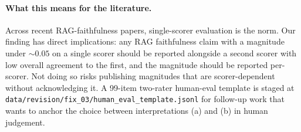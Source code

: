 \paragraph{What this means for the literature.}
Across recent RAG-faithfulness papers, single-scorer evaluation
is the norm. Our finding has direct implications: any RAG
faithfulness claim with a magnitude under $\sim 0.05$ on a single
scorer should be reported alongside a second scorer with low
overall agreement to the first, and the magnitude should be
reported per-scorer. Not doing so risks publishing magnitudes
that are scorer-dependent without acknowledging it.
A 99-item two-rater human-eval template is staged at
\texttt{data/revision/fix\_03/human\_eval\_template.jsonl} for
follow-up work that wants to anchor the choice between
interpretations (a) and (b) in human judgement.
